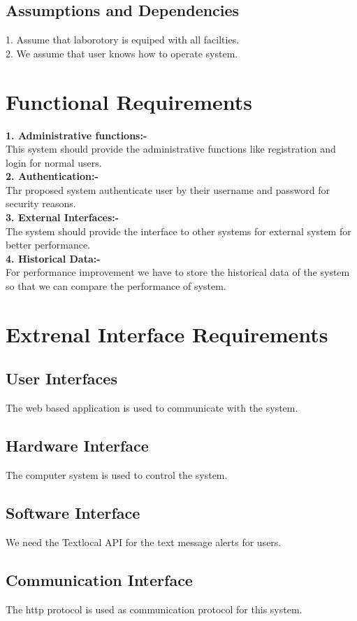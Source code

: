 \documentclass[a4paper,12pt]{report}
\begin{document}
\begin{itemize}
\subsection{Assumptions and Dependencies}
1. Assume that laborotory is equiped with all facilties. \\
2. We assume that user knows how to operate system. \\


\section{Functional Requirements}
\textbf{1. Administrative functions:-} \\
This system should provide the administrative functions like registration and login for normal users.\\
\textbf{2. Authentication:-} \\
Thr proposed system authenticate user by their username and password for security reasons.\\\newline
\textbf{3. External Interfaces:-} \\
The system should provide the interface to other systems for external system for better performance. \\
\textbf{4. Historical Data:-} \\
For performance improvement we have to store the historical data of the system so that we can compare the performance of system. \\

\section{Extrenal Interface Requirements}
\subsection{User Interfaces}
The web based application is used to communicate with the system.
\subsection{Hardware Interface}
The computer system is used to control the system. 
\subsection{Software Interface}
We need the Textlocal API for the text message alerts for users. 
\subsection{Communication Interface}
The http protocol is used as communication protocol for this system.

\end{itemize}
\end{document}
